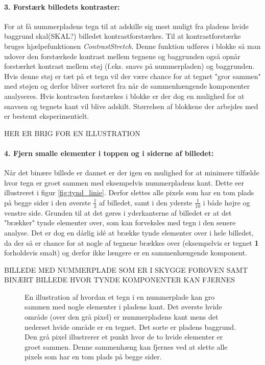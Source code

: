 \paragraph{3. Forstærk billedets kontraster:}
For at få nummerpladens tegn til at adskille sig mest muligt fra pladens hvide baggrund skal(SKAL?) billedet kontrastforstærkes. Til at kontrastforstærke bruges hjælpefunktionen \textit{ContrastStretch}. Denne funktion udføres i blokke så man udover den forstærkede kontrast mellem tegnene og baggrunden også opnår forstærket kontrast mellem støj (f.eks. snavs på nummerpladen) og baggrunden. Hvis denne støj er tæt på et tegn vil der være chance for at tegnet "gror sammen" med støjen og derfor bliver sorteret fra når de sammenhængende komponenter analyseres. Hvis kontrasten forstærkes i blokke er der dog en mulighed for at snavsen og tegnets kant vil blive adskilt. Størrelsen af blokkene der arbejdes med er bestemt eksperimentielt.

HER ER BRIG FOR EN ILLUSTRATION

\paragraph{4. Fjern smalle elementer i toppen og i siderne af billedet:}
Når det binære billede er dannet er der igen en mulighed for at minimere tilfælde hvor tegn er groet sammen med eksempelvis nummerpladens kant. Dette eer illustreret i figur \vref{fig:tynd_linie}. Derfor slettes alle pixels som har en tom plads på begge sider i den øverste $\frac{1}{3}$ af billedet, samt i den yderste $\frac{1}{10}$ i både højre og venstre side. Grunden til at det gøres i yderkanterne af billedet er at det "brækker" tynde elementer over, som kan forveksles med tegn i den senere analyse. Det er dog en dårlig idé at brække tynde elementer over i hele billedet, da der så er chance for at nogle af tegnene brækkes over (eksempelvis er tegnet \textbf{1} forholdsvis smalt) og derfor ikke længere er en sammenhængende komponent.

BILLEDE MED NUMMERPLADE SOM ER I SKYGGE FOROVEN SAMT BINÆRT BILLEDE HVOR TYNDE KOMPONENTER KAN FJERNES

\begin{figure}[htp]
\centering
{} 
\caption{En illustration af hvordan et tegn i en nummerplade kan gro sammen med nogle elementer i pladens kant. Det øverste hvide område (over den grå pixel) er nummerpladens kant mens det nederset hvide område er en tegnet. Det sorte er pladens baggrund. Den grå pixel illustrerer et punkt hvor de to hvide elementer er groet sammen. Denne sammenhæng kan fjernes ved at slette alle pixels som har en tom plads på begge sider.}
\label{fig:tynd_linie}
\end{figure}

